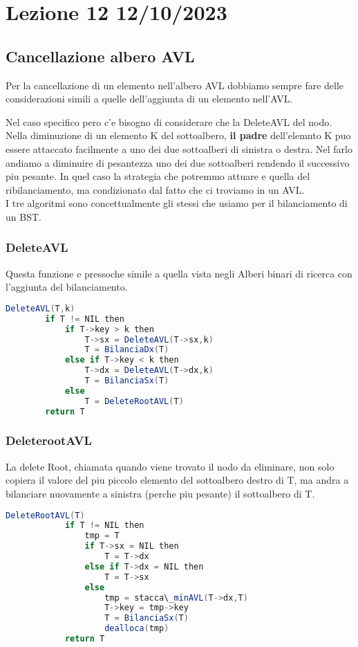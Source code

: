 \section{Lezione 12 12/10/2023}
\subsection{Cancellazione albero AVL}

Per la cancellazione di un elemento nell'albero AVL dobbiamo sempre fare delle considerazioni simili a quelle dell'aggiunta di un elemento nell'AVL.
\medskip

Nel caso specifico pero c'e bisogno di considerare che la DeleteAVL del nodo.
Nella diminuzione di un elemento K del sottoalbero, \textbf{il padre} dell'elemnto K puo essere attaccato facilmente a uno dei due sottoalberi di sinistra o destra.
Nel farlo andiamo a diminuire di pesantezza uno dei due sottoalberi rendendo il successivo piu pesante. In quel caso la strategia che potremmo attuare e quella del ribilanciamento, ma condizionato dal fatto che ci troviamo in un AVL.\\

I tre algoritmi sono concettualmente gli stessi che usiamo per il bilanciamento di un BST.

\subsubsection{DeleteAVL}
Questa funzione e pressoche simile a quella vista negli Alberi binari di ricerca con l'aggiunta del bilanciamento.

\begin{lstlisting}[language=Java]
	DeleteAVL(T,k)
		if T != NIL then
			if T->key > k then
				T->sx = DeleteAVL(T->sx,k)
				T = BilanciaDx(T)
			else if T->key < k then
				T->dx = DeleteAVL(T->dx,k)
				T = BilanciaSx(T)
			else 
				T = DeleteRootAVL(T)
		return T
\end{lstlisting}

\subsubsection{DeleterootAVL}
La delete Root, chiamata quando viene trovato il nodo da eliminare, non solo copiera il valore del piu piccolo elemento del sottoalbero destro di T, ma andra a bilanciare nuovamente a sinistra (perche piu pesante) il sottoalbero di T.

	\begin{lstlisting}[language=Java]
		DeleteRootAVL(T)
			if T != NIL then
				tmp = T
				if T->sx = NIL then
					T = T->dx
				else if T->dx = NIL then
					T = T->sx
				else
					tmp = stacca\_minAVL(T->dx,T)
					T->key = tmp->key
					T = BilanciaSx(T)
					dealloca(tmp)
			return T
	\end{lstlisting}

